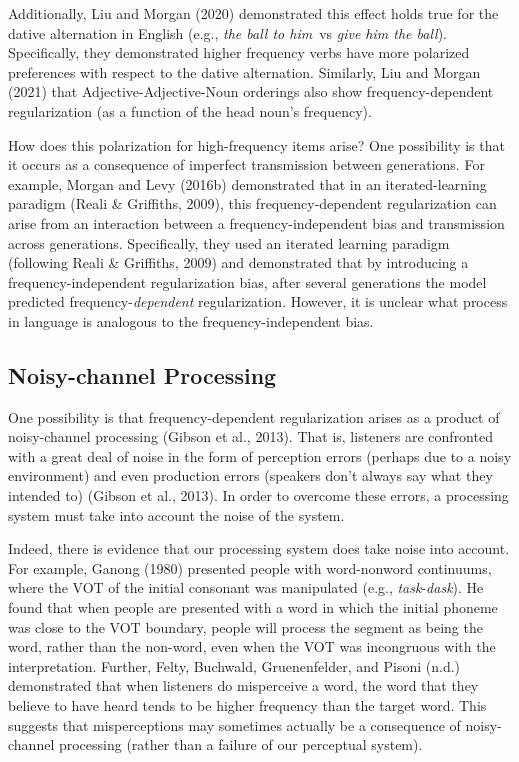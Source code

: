 \documentclass[
  jou,floatsintext]{apa6}
\begin{document}
Additionally, Liu and Morgan (2020) demonstrated this effect holds true for the dative alternation in English (e.g., \emph{the ball to him}~vs \emph{give him the ball}). Specifically, they demonstrated higher frequency verbs have more polarized preferences with respect to the dative alternation. Similarly, Liu and Morgan (2021) that Adjective-Adjective-Noun orderings also show frequency-dependent regularization (as a function of the head noun's frequency).

How does this polarization for high-frequency items arise? One possibility is that it occurs as a consequence of imperfect transmission between generations. For example, Morgan and Levy (2016b) demonstrated that in an iterated-learning paradigm (Reali \& Griffiths, 2009), this frequency-dependent regularization can arise from an interaction between a frequency-independent bias and transmission across generations. Specifically, they used an iterated learning paradigm (following Reali \& Griffiths, 2009) and demonstrated that by introducing a frequency-independent regularization bias, after several generations the model predicted frequency-\emph{dependent} regularization. However, it is unclear what process in language is analogous to the frequency-independent bias.

\subsection{Noisy-channel Processing}\label{noisy-channel-processing}

One possibility is that frequency-dependent regularization arises as a product of noisy-channel processing (Gibson et al., 2013). That is, listeners are confronted with a great deal of noise in the form of perception errors (perhaps due to a noisy environment) and even production errors (speakers don't always say what they intended to) (Gibson et al., 2013). In order to overcome these errors, a processing system must take into account the noise of the system.

Indeed, there is evidence that our processing system does take noise into account. For example, Ganong (1980) presented people with word-nonword continuums, where the VOT of the initial consonant was manipulated (e.g., \emph{task}-\emph{dask}). He found that when people are presented with a word in which the initial phoneme was close to the VOT boundary, people will process the segment as being the word, rather than the non-word, even when the VOT was incongruous with the interpretation. Further, Felty, Buchwald, Gruenenfelder, and Pisoni (n.d.) demonstrated that when listeners do misperceive a word, the word that they believe to have heard tends to be higher frequency than the target word. This suggests that misperceptions may sometimes actually be a consequence of noisy-channel processing (rather than a failure of our perceptual system).
\end{document}
